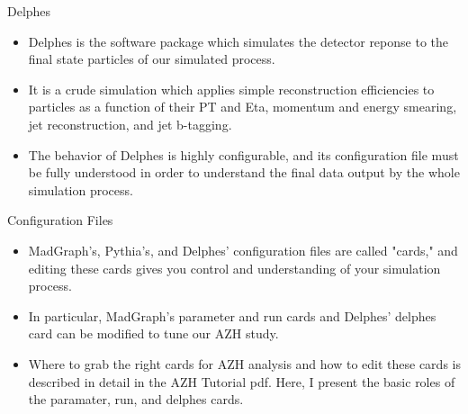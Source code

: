 \documentclass{beamer}
\begin{document}
	\begin{frame}{Delphes}
		\begin{itemize}
\item<1->Delphes is the software package which simulates the detector reponse to the final state particles of our simulated process.

\bigskip

\item<1->It is a crude simulation which applies simple reconstruction efficiencies to particles as a function of their PT and Eta, momentum and energy smearing, jet reconstruction, and jet b-tagging.

\bigskip

\item<1->The behavior of Delphes is highly configurable, and its configuration file must be fully understood in order to understand the final data output by the whole simulation process.
		\end{itemize}
	\end{frame}
	\begin{frame}{Configuration Files}
		\begin{itemize}
\item<1->MadGraph's, Pythia's, and Delphes' configuration files are called "cards," and editing these cards gives you control and understanding of your simulation process.

\bigskip

\item<1->In particular, MadGraph's parameter and run cards and Delphes' delphes card can be modified to tune our AZH study.

\bigskip

\item<1->Where to grab the right cards for AZH analysis and how to edit these cards is described in detail in the AZH Tutorial pdf. Here, I present the basic roles of the paramater, run, and delphes cards.
		\end{itemize}
	\end{frame}
\end{document}
